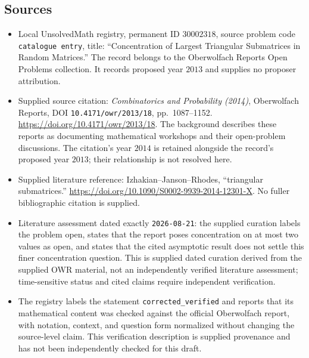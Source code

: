 \documentclass[11pt]{article}
\begin{document}
\subsection{Sources}
\begin{itemize}
\item Local UnsolvedMath registry, permanent ID \(30002318\), source problem code \texttt{catalogue entry}, title: ``Concentration of Largest Triangular Submatrices in Random Matrices.'' The record belongs to the Oberwolfach Reports Open Problems collection. It records proposed year \(2013\) and supplies no proposer attribution.
\item Supplied source citation: \emph{Combinatorics and Probability (2014)}, Oberwolfach Reports, DOI \texttt{10.4171/owr/2013/18}, pp.\ 1087--1152. \url{https://doi.org/10.4171/owr/2013/18}. The background describes these reports as documenting mathematical workshops and their open-problem discussions. The citation's year \(2014\) is retained alongside the record's proposed year \(2013\); their relationship is not resolved here.
\item Supplied literature reference: Izhakian--Janson--Rhodes, ``triangular submatrices.'' \url{https://doi.org/10.1090/S0002-9939-2014-12301-X}. No fuller bibliographic citation is supplied.
\item Literature assessment dated exactly \texttt{2026-08-21}: the supplied curation labels the problem open, states that the report poses concentration on at most two values as open, and states that the cited asymptotic result does not settle this finer concentration question. This is supplied dated curation derived from the supplied OWR material, not an independently verified literature assessment; time-sensitive status and cited claims require independent verification.
\item The registry labels the statement \texttt{corrected\_verified} and reports that its mathematical content was checked against the official Oberwolfach report, with notation, context, and question form normalized without changing the source-level claim. This verification description is supplied provenance and has not been independently checked for this draft.
\end{itemize}
\end{document}
